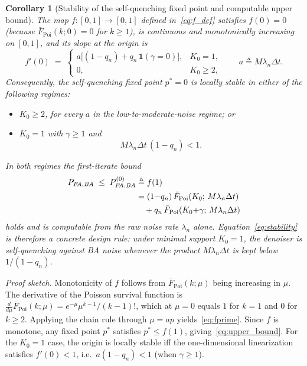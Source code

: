 \documentclass[a4paper,fleqn]{cas-dc}
\newtheorem{corollary}[theorem]{Corollary}
\newcommand{\ind}[1]{\mathbf{1}\!\left(#1\right)}
\newcommand{\Fbar}{\bar{F}}
\begin{document}
\begin{corollary}[Stability of the self-quenching fixed point and computable upper bound]
\label{cor:fixed_point}
The map $f:[0,1]\to[0,1]$ defined in~\eqref{eq:f_def} satisfies $f(0)=0$ (because $\Fbar_{\mathrm{Poi}}(k;0)=0$ for $k\geq 1$), is continuous and monotonically increasing on $[0,1]$, and its slope at the origin is
\begin{equation}
f'(0) \;=\;
\begin{cases}
a\bigl[(1-q_n)+q_n\,\ind{\gamma=0}\bigr], & K_0=1,\\[3pt]
0, & K_0\geq 2,
\end{cases}
\qquad a \triangleq M\lambda_n\Delta t.
\label{eq:fprime}
\end{equation}
Consequently, the self-quenching fixed point $p^{*}=0$ is locally stable in either of the following regimes:
\begin{itemize}
\item $K_0\geq 2$, for every $a$ in the low-to-moderate-noise regime; or
\item $K_0=1$ with $\gamma\geq 1$ and
\begin{equation}
M\lambda_n\Delta t\,(1-q_n)<1.
\label{eq:stability}
\end{equation}
\end{itemize}
In both regimes the first-iterate bound
\begin{equation}
\begin{split}
P_{\emph{FA,BA}} \;\leq\; P_{\emph{FA,BA}}^{(0)} &\triangleq f(1) \\
&= (1{-}q_n)\,\Fbar_{\mathrm{Poi}}(K_0;\,M\lambda_n\Delta t) \\
&\quad + q_n\,\Fbar_{\mathrm{Poi}}(K_0{+}\gamma;\,M\lambda_n\Delta t)
\end{split}
\label{eq:upper_bound}
\end{equation}
holds and is computable from the raw noise rate $\lambda_n$ alone. Equation~\eqref{eq:stability} is therefore a concrete design rule: under minimal support $K_0{=}1$, the denoiser is self-quenching against BA noise whenever the product $M\lambda_n\Delta t$ is kept below $1/(1-q_n)$.
\end{corollary}

\noindent\textit{Proof sketch.}
Monotonicity of $f$ follows from $\Fbar_{\text{Poi}}(k;\mu)$ being increasing in $\mu$. The derivative of the Poisson survival function is $\tfrac{d}{d\mu}\Fbar_{\text{Poi}}(k;\mu) = e^{-\mu}\mu^{k-1}/(k-1)!$, which at $\mu=0$ equals $1$ for $k=1$ and $0$ for $k\geq 2$. Applying the chain rule through $\mu=ap$ yields~\eqref{eq:fprime}. Since $f$ is monotone, any fixed point $p^{*}$ satisfies $p^{*}\leq f(1)$, giving~\eqref{eq:upper_bound}. For the $K_0{=}1$ case, the origin is locally stable iff the one-dimensional linearization satisfies $f'(0)<1$, i.e.\ $a(1-q_n)<1$ (when $\gamma\geq 1$).
\end{document}
